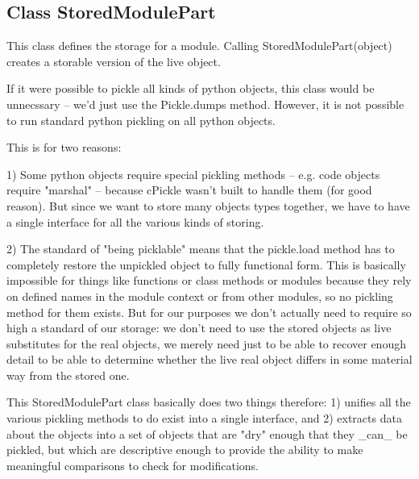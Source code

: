 
\subsection{Class StoredModulePart}

    \label{System:Storage:StoredModulePart}
This class defines the storage for a module. Calling 
StoredModulePart(object) creates a storable version of the live object.

If it were possible to pickle all kinds of python objects,      this class 
would be unnecssary -- we'd just use the Pickle.dumps method.    However, 
it is not possible to run standard python pickling on all python objects.

This is for two reasons:

1) Some python objects require special pickling methods -- e.g. code 
objects require "marshal" -- because cPickle wasn't built to handle them 
(for good reason).  But since we want to store many objects types together,
we have to have a single interface for all the various kinds of storing.

2) The standard of "being picklable" means that the pickle.load method has 
to completely restore the unpickled object to fully functional form. This 
is basically impossible for things like functions or class methods or 
modules because they rely on defined names in the module context or from 
other modules, so no pickling method for them exists.   But for our 
purposes we don't actually need to require so high a standard of our 
storage: we don't need to use the stored objects as live substitutes for 
the real objects, we merely need just to be able to recover enough detail 
to be able to determine whether the live real object differs in some 
material way from the stored one.

This StoredModulePart class basically does two things therefore: 1) unifies
all the various pickling methods to do exist into a single interface, and 
2) extracts data about the objects into a set of objects that are "dry" 
enough that they \_can\_ be pickled, but which are descriptive enough to 
provide the ability to make meaningful comparisons to check for 
modifications.


